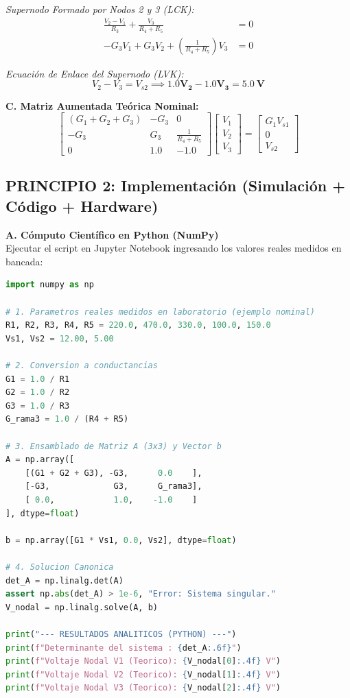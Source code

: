 \documentclass[11pt, a4paper]{article}
\begin{document}
\textit{Supernodo Formado por Nodos 2 y 3 (LCK):}
\begin{align*}
    \frac{V_2 - V_1}{R_3} + \frac{V_3}{R_4 + R_5} &= 0 \\
    -G_3 V_1 + G_3 V_2 + \left( \frac{1}{R_4 + R_5} \right) V_3 &= 0
\end{align*}

\textit{Ecuación de Enlace del Supernodo (LVK):}
\begin{equation}
    V_2 - V_3 = V_{s2} \implies \mathbf{1.0 V_2 - 1.0 V_3 = \qty{5.0}{\volt}}
\end{equation}

\textbf{C. Matriz Aumentada Teórica Nominal:}
\begin{equation*}
    \begin{bmatrix} 
    (G_1 + G_2 + G_3) & -G_3 & 0 \\ 
    -G_3 & G_3 & \frac{1}{R_4+R_5} \\ 
    0 & 1.0 & -1.0 
    \end{bmatrix} 
    \begin{bmatrix} V_1 \\ V_2 \\ V_3 \end{bmatrix} = 
    \begin{bmatrix} G_1 V_{s1} \\ 0 \\ V_{s2} \end{bmatrix}
\end{equation*}

\subsection*{PRINCIPIO 2: Implementación (Simulación + Código + Hardware)}
\textbf{A. Cómputo Científico en Python (NumPy)}\\
Ejecutar el script en Jupyter Notebook ingresando los valores reales medidos en bancada:
\begin{lstlisting}[language=Python]
import numpy as np

# 1. Parametros reales medidos en laboratorio (ejemplo nominal)
R1, R2, R3, R4, R5 = 220.0, 470.0, 330.0, 100.0, 150.0
Vs1, Vs2 = 12.00, 5.00

# 2. Conversion a conductancias
G1 = 1.0 / R1
G2 = 1.0 / R2
G3 = 1.0 / R3
G_rama3 = 1.0 / (R4 + R5)

# 3. Ensamblado de Matriz A (3x3) y Vector b
A = np.array([
    [(G1 + G2 + G3), -G3,      0.0    ],
    [-G3,             G3,      G_rama3],
    [ 0.0,            1.0,    -1.0    ]
], dtype=float)

b = np.array([G1 * Vs1, 0.0, Vs2], dtype=float)

# 4. Solucion Canonica
det_A = np.linalg.det(A)
assert np.abs(det_A) > 1e-6, "Error: Sistema singular."
V_nodal = np.linalg.solve(A, b)

print("--- RESULTADOS ANALITICOS (PYTHON) ---")
print(f"Determinante del sistema : {det_A:.6f}")
print(f"Voltaje Nodal V1 (Teorico): {V_nodal[0]:.4f} V")
print(f"Voltaje Nodal V2 (Teorico): {V_nodal[1]:.4f} V")
print(f"Voltaje Nodal V3 (Teorico): {V_nodal[2]:.4f} V")
\end{lstlisting}
\end{document}
